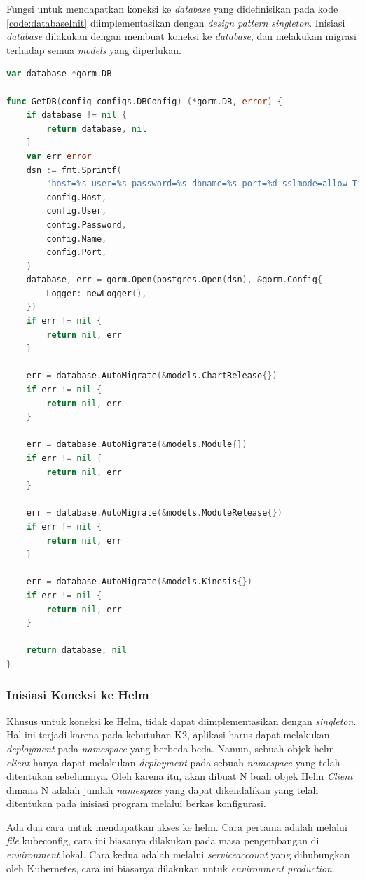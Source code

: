 Fungsi untuk mendapatkan koneksi ke \textit{database} yang didefinisikan pada kode \ref{code:databaseInit} diimplementasikan dengan \textit{design pattern singleton}. Inisiasi \textit{database} dilakukan dengan membuat koneksi ke \textit{database}, dan melakukan migrasi terhadap semua \textit{models} yang diperlukan.
\begin{lstlisting}[frame=single,language=Go,caption={Fungsi untuk inisiasi koneksi ke \textit{Database}},label={code:databaseInit}]
var database *gorm.DB

func GetDB(config configs.DBConfig) (*gorm.DB, error) {
	if database != nil {
		return database, nil
	}
	var err error
	dsn := fmt.Sprintf(
		"host=%s user=%s password=%s dbname=%s port=%d sslmode=allow TimeZone=UTC",
		config.Host,
		config.User,
		config.Password,
		config.Name,
		config.Port,
	)
	database, err = gorm.Open(postgres.Open(dsn), &gorm.Config{
		Logger: newLogger(),
	})
	if err != nil {
		return nil, err
	}

	err = database.AutoMigrate(&models.ChartRelease{})
	if err != nil {
		return nil, err
	}

	err = database.AutoMigrate(&models.Module{})
	if err != nil {
		return nil, err
	}

	err = database.AutoMigrate(&models.ModuleRelease{})
	if err != nil {
		return nil, err
	}

	err = database.AutoMigrate(&models.Kinesis{})
	if err != nil {
		return nil, err
	}

	return database, nil
}
\end{lstlisting}

\subsubsection{Inisiasi Koneksi ke Helm}
\label{sec:initHelm}

Khusus untuk koneksi ke Helm, tidak dapat diimplementasikan dengan \textit{singleton}. Hal ini terjadi karena pada kebutuhan K2, aplikasi harus dapat melakukan \textit{deployment} pada \textit{namespace} yang berbeda-beda. Namun, sebuah objek helm \textit{client} hanya dapat melakukan \textit{deployment} pada sebuah \textit{namespace} yang telah ditentukan sebelumnya. Oleh karena itu, akan dibuat N buah objek Helm \textit{Client} dimana N adalah jumlah \textit{namespace} yang dapat dikendalikan yang telah ditentukan pada inisiasi program melalui berkas konfigurasi.

Ada dua cara untuk mendapatkan akses ke helm. Cara pertama adalah melalui \textit{file} kubeconfig, cara ini biasanya dilakukan pada masa pengembangan di \textit{environment} lokal. Cara kedua adalah melalui \textit{serviceaccount} yang dihubungkan oleh Kubernetes, cara ini biasanya dilakukan untuk \textit{environment} \textit{production}.

